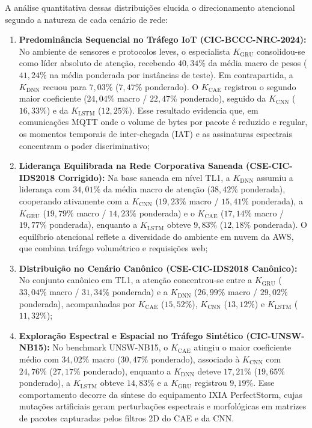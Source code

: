 A análise quantitativa dessas distribuições elucida o direcionamento atencional segundo a natureza de
cada cenário de rede:
\begin{enumerate}
    \item \textbf{Predominância Sequencial no Tráfego IoT (CIC-BCCC-NRC-2024):}
    No ambiente de sensores e protocolos leves, o especialista $K_{\mathrm{GRU}}$
    consolidou-se como líder absoluto de atenção, recebendo $40{,}34\%$ da média macro de pesos
    ($41{,}24\%$ na média ponderada por instâncias de teste). Em contrapartida, a
    $K_{\mathrm{DNN}}$ recuou para $7{,}03\%$ ($7{,}47\%$ ponderado). O
    $K_{\mathrm{CAE}}$ registrou o segundo maior coeficiente ($24{,}04\%$ macro / $22{,}47\%$
    ponderado), seguido da $K_{\mathrm{CNN}}$ ($16{,}33\%$) e da $K_{\mathrm{LSTM}}$
    ($12{,}25\%$). Esse resultado evidencia que, em comunicações MQTT onde o volume de bytes por pacote é
    reduzido e regular, os momentos temporais de inter-chegada (IAT) e as assinaturas espectrais concentram
    o poder discriminativo;
    
    \item \textbf{Liderança Equilibrada na Rede Corporativa Saneada (CSE-CIC-IDS2018 Corrigido):}
    Na base saneada em nível TL1, a $K_{\mathrm{DNN}}$ assumiu a liderança com $34{,}01\%$ da
    média macro de atenção ($38{,}42\%$ ponderada), cooperando ativamente com a
    $K_{\mathrm{CNN}}$ ($19{,}23\%$ macro / $15{,}41\%$ ponderada), a
    $K_{\mathrm{GRU}}$ ($19{,}79\%$ macro / $14{,}23\%$ ponderada) e o
    $K_{\mathrm{CAE}}$ ($17{,}14\%$ macro / $19{,}77\%$ ponderada), enquanto a
    $K_{\mathrm{LSTM}}$ obteve $9{,}83\%$ ($12{,}18\%$ ponderada). O equilíbrio atencional
    reflete a diversidade do ambiente em nuvem da AWS, que combina tráfego volumétrico e requisições web;
    
    \item \textbf{Distribuição no Cenário Canônico (CSE-CIC-IDS2018 Canônico):}
    No conjunto canônico em TL1, a atenção concentrou-se entre a $K_{\mathrm{GRU}}$
    ($33{,}04\%$ macro / $31{,}34\%$ ponderada) e a $K_{\mathrm{DNN}}$ ($26{,}99\%$ macro /
    $29{,}02\%$ ponderada), acompanhadas por $K_{\mathrm{CAE}}$ ($15{,}52\%$),
    $K_{\mathrm{CNN}}$ ($13{,}12\%$) e $K_{\mathrm{LSTM}}$ ($11{,}32\%$);
    
    \item \textbf{Exploração Espectral e Espacial no Tráfego Sintético (CIC-UNSW-NB15):}
    No benchmark UNSW-NB15, o $K_{\mathrm{CAE}}$ atingiu o maior coeficiente médio com
    $34{,}02\%$ macro ($30{,}47\%$ ponderado), associado à $K_{\mathrm{CNN}}$ com $24{,}76\%$
    ($27{,}17\%$ ponderado), enquanto a $K_{\mathrm{DNN}}$ deteve $17{,}21\%$ ($19{,}65\%$
    ponderado), a $K_{\mathrm{LSTM}}$ obteve $14{,}83\%$ e a $K_{\mathrm{GRU}}$
    registrou $9{,}19\%$. Esse comportamento decorre da síntese do equipamento IXIA PerfectStorm, cujas
    mutações artificiais geram perturbações espectrais e morfológicas em matrizes de pacotes capturadas
    pelos filtros 2D do CAE e da CNN.
\end{enumerate}

